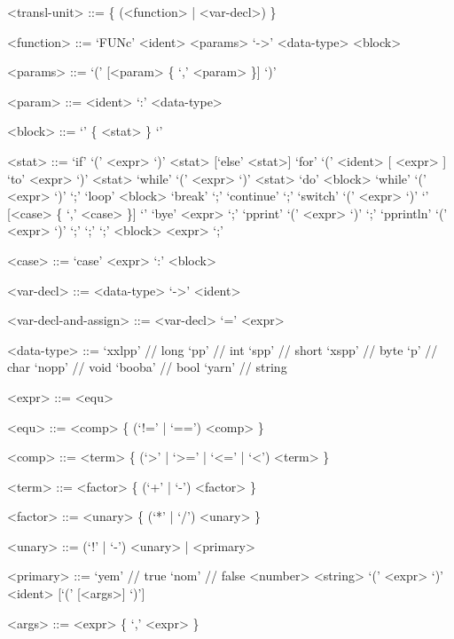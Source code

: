 \documentclass[12pt, a4paper]{article}
\begin{document}
    \setlength{\grammarparsep}{0.6em} %
    \setlength{\grammarindent}{10em} %

    \begin{grammar}

        <transl-unit> ::= \{ (<function> | <var-decl>) \}

        <function> ::= `FUNc' <ident> <params> `->' <data-type> <block>

        <params> ::= `(' [<param> \{ `,' <param> \}] `)'

        <param> ::= <ident> `:' <data-type>

        <block> ::= `{' \{ <stat> \} `}'

        <stat> ::= `if' `(' <expr> `)' <stat> [`else' <stat>]
        \alt `for' `(' <ident> [ <expr> ] `to' <expr> `)' <stat>
        \alt `while' `(' <expr> `)' <stat>
        \alt `do' <block> `while' `(' <expr> `)' `;'
        \alt `loop' <block>
        \alt `break' `;'
        \alt `continue' `;'
        \alt `switch' `(' <expr> `)' `{' [<case> \{ `,' <case> \}] `}'
        \alt `bye' <expr> `;'
        \alt `pprint' `(' <expr> `)' `;'
        \alt `pprintln' `(' <expr> `)' `;'
        \alt `;'
         `;'
        \alt <block>
        \alt <expr> `;'

        <case> ::= `case' <expr> `:' <block>

        <var-decl> ::= <data-type> `->' <ident>

        <var-decl-and-assign> ::= <var-decl> `=' <expr>

        <data-type> ::= `xxlpp' // long
        \alt `pp' // int
        \alt `spp' // short
        \alt `xspp' // byte
        \alt `p' // char
        \alt `nopp' // void
        \alt `booba' // bool
        \alt `yarn' // string

        <expr> ::= <equ>

        <equ> ::= <comp> \{ (`!=' | `==') <comp> \}

        <comp> ::= <term> \{ (`>' | `>=' | `<=' | `<') <term> \}

        <term> ::= <factor> \{ (`+' | `-') <factor> \}

        <factor> ::= <unary> \{ (`*' | `/') <unary> \}

        <unary> ::= (`!' | `-') <unary> | <primary>

        <primary> ::= `yem' // true
        \alt `nom' // false
        \alt <number>
        \alt <string>
        \alt `(' <expr> `)'
        \alt <ident> [`(' [<args>] `)']

        <args> ::= <expr> \{ `,' <expr> \}
    \end{grammar}
\end{document}

